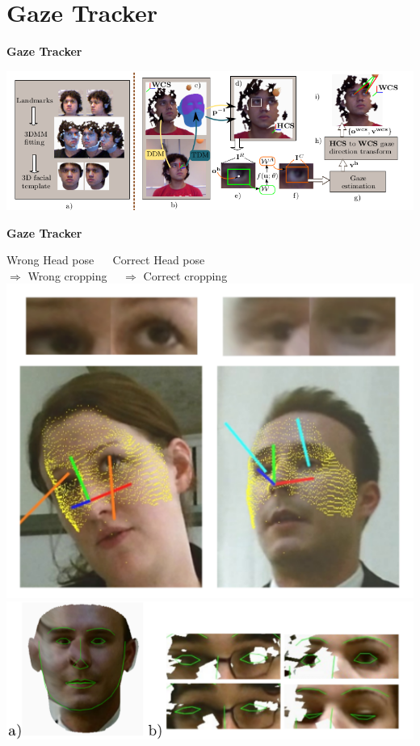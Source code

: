 \documentclass{beamer}
\begin{document}
\section{Gaze Tracker}
\begin{frame}
\textbf{Gaze Tracker}
\begin{center}
\includegraphics[scale=0.4]{Pictures/HG3D_bis.png}
\end{center}
\end{frame}

\begin{frame}
\textbf{Gaze Tracker}
\begin{center}
Wrong Head pose ~~ Correct Head pose \\
$\Rightarrow$ Wrong cropping ~~$\Rightarrow$ Correct cropping \\
\includegraphics[scale=0.3]{Pictures/EyeCropping.png} \\
\includegraphics[scale=0.2]{Pictures/LandmarkEye.png}
\end{center}
\end{frame}
\end{document}
